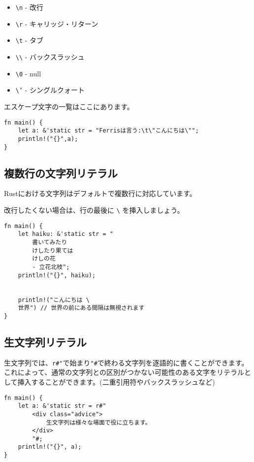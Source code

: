 \begin{itemize}
\item
  \texttt{\textbackslash n} - 改行
\item
  \texttt{\textbackslash r} - キャリッジ・リターン
\item
  \texttt{\textbackslash t} - タブ
\item
  \texttt{\textbackslash \textbackslash} - バックスラッシュ
\item
  \texttt{\textbackslash 0} - null
\item
  \texttt{\textbackslash '} - シングルクォート
\end{itemize}

エスケープ文字の一覧はここにあります。

\begin{verbatim}
fn main() {
    let a: &'static str = "Ferrisは言う:\t\"こんにちは\"";
    println!("{}",a);
}
\end{verbatim}

\subsection{複数行の文字列リテラル}

Rustにおける文字列はデフォルトで複数行に対応しています。

改行したくない場合は、行の最後に \texttt{\textbackslash}
を挿入しましょう。

\begin{verbatim}
fn main() {
    let haiku: &'static str = "
        書いてみたり
        けしたり果ては
        けしの花
        - 立花北枝";
    println!("{}", haiku);


    println!("こんにちは \
    世界") // 世界の前にある間隔は無視されます
}
\end{verbatim}

\subsection{生文字列リテラル}

生文字列では、\texttt{r\#"}で始まり\texttt{"\#}で終わる文字列を逐語的に書くことができます。
これによって、通常の文字列との区別がつかない可能性のある文字をリテラルとして挿入することができます。(二重引用符やバックスラッシュなど)

\begin{verbatim}
fn main() {
    let a: &'static str = r#"
        <div class="advice">
            生文字列は様々な場面で役に立ちます。
        </div>
        "#;
    println!("{}", a);
}
\end{verbatim}

